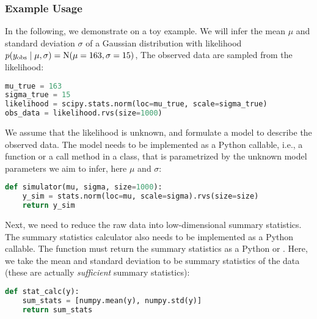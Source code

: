 \subsubsection*{Example Usage}

In the following, we demonstrate  on a toy example. We will infer the mean $\mu$ and standard deviation $\sigma$ of a Gaussian distribution with likelihood $p \qty(y_\mathrm{obs} \mid \mu, \sigma) = \mathrm{N} \qty(\mu=163, \sigma=15)$, The observed data are sampled from the likelihood: 

\begin{lstlisting}[language=python]
mu_true = 163
sigma_true = 15
likelihood = scipy.stats.norm(loc=mu_true, scale=sigma_true)
obs_data = likelihood.rvs(size=1000) 
\end{lstlisting}

We assume that the likelihood is unknown, and formulate a model to describe the observed data. The model needs to be implemented as a Python callable, i.e., a function or a call method in a class, that is parametrized by the unknown model parameters we aim to infer, here $\mu$ and $\sigma$: 

\begin{lstlisting}[language=python]
def simulator(mu, sigma, size=1000):
    y_sim = stats.norm(loc=mu, scale=sigma).rvs(size=size)
    return y_sim
\end{lstlisting}

Next, we need to reduce the raw data into low-dimensional summary statistics. The summary statistics calculator also needs to be implemented as a Python callable. The function must return the summary statistics as a Python  or . Here, we take the mean and standard deviation to be summary statistics of the data (these are actually \textit{sufficient} summary statistics): 

\begin{lstlisting}[language=python]
def stat_calc(y):
    sum_stats = [numpy.mean(y), numpy.std(y)]
    return sum_stats
\end{lstlisting}

